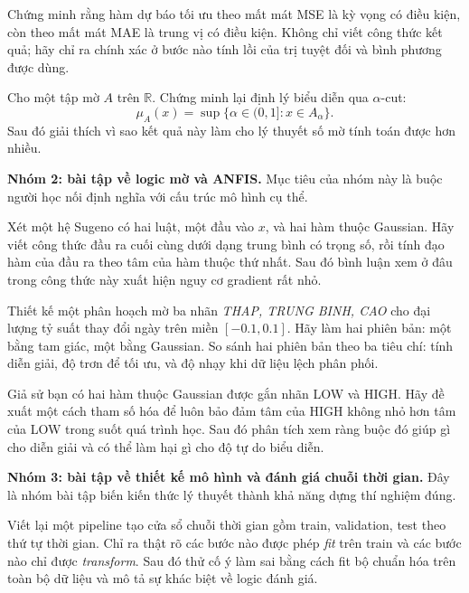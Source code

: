 \begin{exercise}
Chứng minh rằng hàm dự báo tối ưu theo mất mát MSE là kỳ vọng có điều kiện, còn theo mất mát MAE là trung vị có điều kiện. Không chỉ viết công thức kết quả; hãy chỉ ra chính xác ở bước nào tính lồi của trị tuyệt đối và bình phương được dùng.
\end{exercise}

\begin{exercise}
Cho một tập mờ \(A\) trên \(\mathbb{R}\). Chứng minh lại định lý biểu diễn qua \(\alpha\)-cut:
\[
\mu_A(x)=\sup\{\alpha\in(0,1]:x\in A_\alpha\}.
\]
Sau đó giải thích vì sao kết quả này làm cho lý thuyết số mờ tính toán được hơn nhiều.
\end{exercise}

\textbf{Nhóm 2: bài tập về logic mờ và ANFIS.} Mục tiêu của nhóm này là buộc người học nối định nghĩa với cấu trúc mô hình cụ thể.

\begin{exercise}
Xét một hệ Sugeno có hai luật, một đầu vào \(x\), và hai hàm thuộc Gaussian. Hãy viết công thức đầu ra cuối cùng dưới dạng trung bình có trọng số, rồi tính đạo hàm của đầu ra theo tâm của hàm thuộc thứ nhất. Sau đó bình luận xem ở đâu trong công thức này xuất hiện nguy cơ gradient rất nhỏ.
\end{exercise}

\begin{exercise}
Thiết kế một phân hoạch mờ ba nhãn \emph{THAP, TRUNG BINH, CAO} cho đại lượng tỷ suất thay đổi ngày trên miền \([-0.1,0.1]\). Hãy làm hai phiên bản: một bằng tam giác, một bằng Gaussian. So sánh hai phiên bản theo ba tiêu chí: tính diễn giải, độ trơn để tối ưu, và độ nhạy khi dữ liệu lệch phân phối.
\end{exercise}

\begin{exercise}
Giả sử bạn có hai hàm thuộc Gaussian được gắn nhãn LOW và HIGH. Hãy đề xuất một cách tham số hóa để luôn bảo đảm tâm của HIGH không nhỏ hơn tâm của LOW trong suốt quá trình học. Sau đó phân tích xem ràng buộc đó giúp gì cho diễn giải và có thể làm hại gì cho độ tự do biểu diễn.
\end{exercise}

\textbf{Nhóm 3: bài tập về thiết kế mô hình và đánh giá chuỗi thời gian.} Đây là nhóm bài tập biến kiến thức lý thuyết thành khả năng dựng thí nghiệm đúng.

\begin{exercise}
Viết lại một pipeline tạo cửa sổ chuỗi thời gian gồm train, validation, test theo thứ tự thời gian. Chỉ ra thật rõ các bước nào được phép \emph{fit} trên train và các bước nào chỉ được \emph{transform}. Sau đó thử cố ý làm sai bằng cách fit bộ chuẩn hóa trên toàn bộ dữ liệu và mô tả sự khác biệt về logic đánh giá.
\end{exercise}

